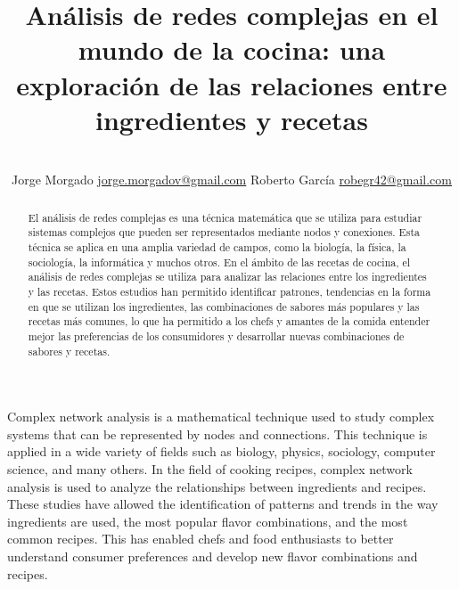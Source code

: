\documentclass[a4paper]{article}
\title{Análisis de redes complejas en el mundo de la cocina: una exploración de
las relaciones entre ingredientes y recetas}
\author{\\
\name Jorge Morgado \email \href{mailto:jorge.morgadov@gmail.com}{jorge.morgadov@gmail.com}
	\AND
\name Roberto García \email \href{mailto:robegr42@gmail.com}{robegr42@gmail.com}
}
\begin{document}

\maketitle


\begin{abstract}

	El análisis de redes complejas es una técnica matemática que se utiliza para
	estudiar sistemas complejos que pueden ser representados mediante nodos y
	conexiones. Esta técnica se aplica en una amplia variedad de campos, como la
	biología, la física, la sociología, la informática y muchos otros. En el
	ámbito de las recetas de cocina, el análisis de redes complejas se utiliza
	para analizar las relaciones entre los ingredientes y las recetas. Estos
	estudios han permitido identificar patrones, tendencias en la forma en que
	se utilizan los ingredientes,  las combinaciones de sabores más populares y
	las recetas más comunes, lo que ha permitido a los chefs y amantes de la
	comida entender mejor las preferencias de los consumidores y desarrollar
	nuevas combinaciones de sabores y recetas.

\end{abstract}

\vspace{0.5cm}

\begin{enabstract}

	Complex network analysis is a mathematical technique used to study complex
	systems that can be represented by nodes and connections. This technique is
	applied in a wide variety of fields such as biology, physics, sociology,
	computer science, and many others. In the field of cooking recipes, complex
	network analysis is used to analyze the relationships between ingredients
	and recipes. These studies have allowed the identification of patterns and
	trends in the way ingredients are used, the most popular flavor
	combinations, and the most common recipes. This has enabled chefs and food
	enthusiasts to better understand consumer preferences and develop new flavor
	combinations and recipes.

\end{enabstract}
\end{document}
